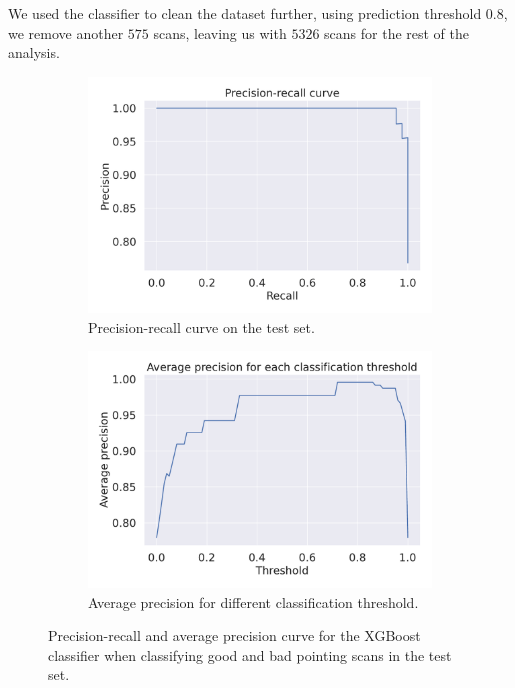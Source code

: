 We used the classifier to clean the dataset further, using prediction threshold $0.8$, we remove another $575$ scans, leaving us with
$5326$ scans for the rest of the analysis.


\begin{figure}[H]
    \centering
    \begin{subfigure}[t]{0.49\textwidth}
        \centering
        \includegraphics[width=1\textwidth]{Clf/precision_recall_curve_both.pdf}
        \caption{Precision-recall curve on the test set.}
        \label{subfig:pr_curve}
    \end{subfigure}
    \begin{subfigure}[t]{0.49\textwidth}
       \centering
       \includegraphics[width=1\textwidth]{Clf/mAP_curve_both.pdf}
       \caption{Average precision for different classification threshold.}
       \label{subfig:map_curve}
    \end{subfigure}
     \caption[Performance plots of XGBoost pointing scan classifier]{Precision-recall and average precision curve for the XGBoost classifier when classifying good and bad pointing scans in the test set.}
     \label{fig:pointing_scan_clf}
\end{figure}



